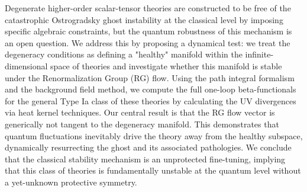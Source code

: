 \documentclass[twocolumn]{aastex631}
\begin{document}
Degenerate higher-order scalar-tensor theories are constructed to be free of the catastrophic Ostrogradsky ghost instability at the classical level by imposing specific algebraic constraints, but the quantum robustness of this mechanism is an open question. We address this by proposing a dynamical test: we treat the degeneracy conditions as defining a "healthy" manifold within the infinite-dimensional space of theories and investigate whether this manifold is stable under the Renormalization Group (RG) flow. Using the path integral formalism and the background field method, we compute the full one-loop beta-functionals for the general Type Ia class of these theories by calculating the UV divergences via heat kernel techniques. Our central result is that the RG flow vector is generically not tangent to the degeneracy manifold. This demonstrates that quantum fluctuations inevitably drive the theory away from the healthy subspace, dynamically resurrecting the ghost and its associated pathologies. We conclude that the classical stability mechanism is an unprotected fine-tuning, implying that this class of theories is fundamentally unstable at the quantum level without a yet-unknown protective symmetry.
\end{document}
